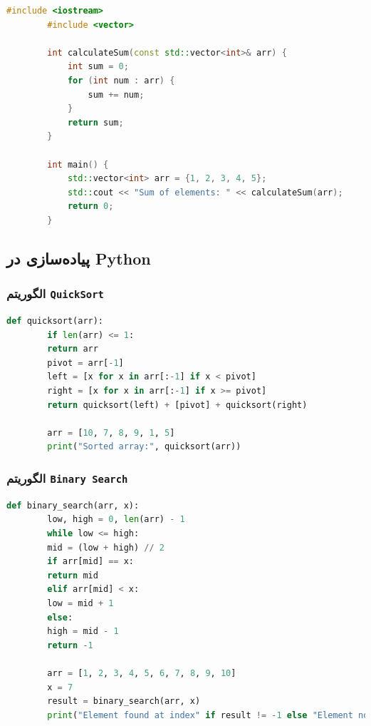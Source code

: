 \documentclass[12pt, a4paper]{report}
\begin{document}
\begin{LTR}
	\begin{lstlisting}[language=C++, breaklines=true]
		#include <iostream>
		#include <vector>
		
		int calculateSum(const std::vector<int>& arr) {
			int sum = 0;
			for (int num : arr) {
				sum += num;
			}
			return sum;
		}
		
		int main() {
			std::vector<int> arr = {1, 2, 3, 4, 5};
			std::cout << "Sum of elements: " << calculateSum(arr);
			return 0;
		}
	\end{lstlisting}
\end{LTR}

\subsection{پیاده‌سازی در Python}

\subsubsection{الگوریتم \texttt{QuickSort}}
\begin{LTR}
	\begin{lstlisting}[language=Python, breaklines=true]
		def quicksort(arr):
		if len(arr) <= 1:
		return arr
		pivot = arr[-1]
		left = [x for x in arr[:-1] if x < pivot]
		right = [x for x in arr[:-1] if x >= pivot]
		return quicksort(left) + [pivot] + quicksort(right)
		
		arr = [10, 7, 8, 9, 1, 5]
		print("Sorted array:", quicksort(arr))
	\end{lstlisting}
\end{LTR}

\subsubsection{الگوریتم \texttt{Binary Search}}

\begin{LTR}
	\begin{lstlisting}[language=Python, breaklines=true]
		def binary_search(arr, x):
		low, high = 0, len(arr) - 1
		while low <= high:
		mid = (low + high) // 2
		if arr[mid] == x:
		return mid
		elif arr[mid] < x:
		low = mid + 1
		else:
		high = mid - 1
		return -1
		
		arr = [1, 2, 3, 4, 5, 6, 7, 8, 9, 10]
		x = 7
		result = binary_search(arr, x)
		print("Element found at index" if result != -1 else "Element not found")
	\end{lstlisting}
\end{LTR}
\end{document}
